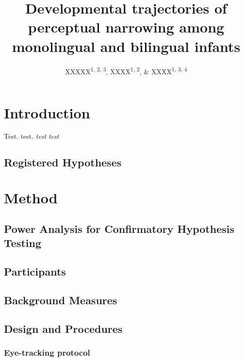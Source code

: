 \documentclass[man]{apa6}
\title{Developmental trajectories of perceptual narrowing among monolingual and bilingual infants}
\author{XXXXX\textsuperscript{1, 2, 3}, XXXX\textsuperscript{1, 2}, \& XXXX\textsuperscript{1, 3, 4}}
\date{}
\affiliation{
\vspace{0.5cm}
\textsuperscript{1} XXXX\\\textsuperscript{2} XXXXX\\\textsuperscript{3} XXXXX\\\textsuperscript{4} XXXXX}
\begin{document}
\maketitle

\hypertarget{introduction}{%
\section{Introduction}\label{introduction}}

Test. test.
\emph{test}
\emph{test}

\hypertarget{registered-hypotheses}{%
\subsection{Registered Hypotheses}\label{registered-hypotheses}}

\hypertarget{method}{%
\section{Method}\label{method}}

\hypertarget{power-analysis-for-confirmatory-hypothesis-testing}{%
\subsection{Power Analysis for Confirmatory Hypothesis Testing}\label{power-analysis-for-confirmatory-hypothesis-testing}}

\hypertarget{participants}{%
\subsection{Participants}\label{participants}}

\hypertarget{background-measures}{%
\subsection{Background Measures}\label{background-measures}}

\hypertarget{design-and-procedures}{%
\subsection{Design and Procedures}\label{design-and-procedures}}

\hypertarget{eye-tracking-protocol}{%
\subsubsection{Eye-tracking protocol}\label{eye-tracking-protocol}}
\end{document}
